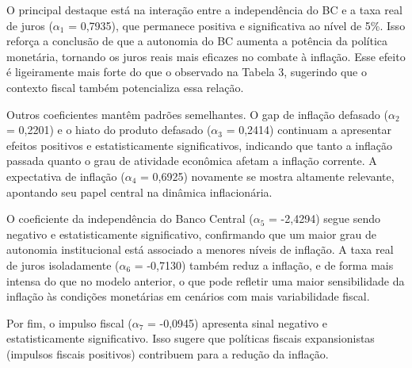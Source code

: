\documentclass[a4paper,12pt]{article}
\begin{document}
O principal destaque está na interação entre a independência do BC e a taxa real de juros ($\alpha_1$ = 0,7935), que permanece positiva e significativa ao nível de 5\%. Isso reforça a conclusão de que a autonomia do BC aumenta a potência da política monetária, tornando os juros reais mais eficazes no combate à inflação. Esse efeito é ligeiramente mais forte do que o observado na Tabela 3, sugerindo que o contexto fiscal também potencializa essa relação.

Outros coeficientes mantêm padrões semelhantes. O gap de inflação defasado ($\alpha_2$ = 0,2201) e o hiato do produto defasado ($\alpha_3$ = 0,2414) continuam a apresentar efeitos positivos e estatisticamente significativos, indicando que tanto a inflação passada quanto o grau de atividade econômica afetam a inflação corrente. A expectativa de inflação ($\alpha_4$ = 0,6925) novamente se mostra altamente relevante, apontando seu papel central na dinâmica inflacionária.

O coeficiente da independência do Banco Central ($\alpha_5$ = -2,4294) segue sendo negativo e estatisticamente significativo, confirmando que um maior grau de autonomia institucional está associado a menores níveis de inflação. A taxa real de juros isoladamente ($\alpha_6$ = -0,7130) também reduz a inflação, e de forma mais intensa do que no modelo anterior, o que pode refletir uma maior sensibilidade da inflação às condições monetárias em cenários com mais variabilidade fiscal.

Por fim, o impulso fiscal ($\alpha_7$ = -0,0945) apresenta sinal negativo e estatisticamente significativo. Isso sugere que políticas fiscais expansionistas (impulsos fiscais positivos) contribuem para a redução da inflação.
\end{document}

